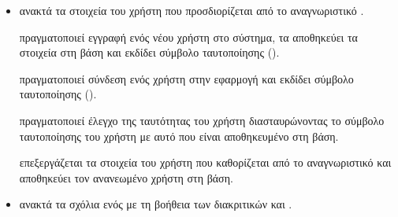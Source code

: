 \begin{itemize}
    \item {}
    
    \newline \newline
    \textbf{}
    \newline \newline \noindent
    ανακτά τα στοιχεία του χρήστη που προσδιορίζεται από το αναγνωριστικό .
    
    \newline \newline
    \textbf{}
    \newline \newline \noindent
    πραγματοποιεί εγγραφή ενός νέου χρήστη στο σύστημα, τα αποθηκεύει τα στοιχεία στη βάση και εκδίδει σύμβολο ταυτοποίησης ().
    
    \newpage
    \newline \newline
    \textbf{}
    \newline \newline \noindent
    πραγματοποιεί σύνδεση ενός χρήστη στην εφαρμογή και εκδίδει σύμβολο ταυτοποίησης ().
    
    \newline \newline
    \textbf{}
    \newline \newline \noindent
    πραγματοποιεί έλεγχο της ταυτότητας του χρήστη διασταυρώνοντας το σύμβολο ταυτοποίησης του χρήστη με αυτό που είναι αποθηκευμένο στη βάση.
    
    \newline \newline
    \textbf{}
    \newline \newline \noindent
    επεξεργάζεται τα στοιχεία του χρήστη που καθορίζεται από το αναγνωριστικό  και αποθηκεύει τον ανανεωμένο χρήστη στη βάση.
    
    \item {}
    
    \newline \newline
    \textbf{}
    \newline \newline \noindent
    ανακτά τα σχόλια ενός  με τη βοήθεια των διακριτικών  και .
    

\end{itemize}
